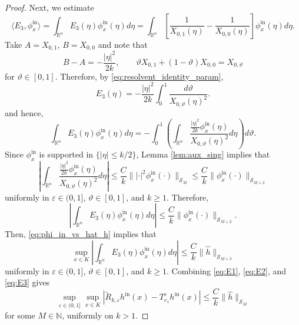 \documentclass[12pt,a4paper]{amsart}
\numberwithin{equation}{section}
\theoremstyle{plain}
\theoremstyle{definition}
\begin{document}
\begin{proof}
Next, we estimate 
\begin{equation*}
    \langle E_3, \phi_x^{\mathrm{in}} \rangle = \int_{\mathbb{R}^n}
    E_3(\eta) \phi_x^{\mathrm{in}}(\eta) d\eta 
    = 
    \int_{\mathbb{R}^n}
    \left[\frac{1}{X_{0,1}(\eta)} - \frac{1}{X_{0,0}(\eta)}\right]\phi_x^{\mathrm{in}}(\eta) d\eta.
\end{equation*}
Take $A = X_{0,1}$, $B = X_{0,0}$ and note that
\begin{equation*}
    B - A = -\frac{|\eta|^2}{2k},
    \qquad
    \vartheta X_{0,1} + (1-\vartheta) X_{0,0} = X_{0,\vartheta}
\end{equation*}
for $\vartheta\in[0,1]$. Therefore, by \eqref{eq:resolvent_identity_param},
\begin{equation*}
    E_3(\eta) = -\frac{|\eta|^2}{2k}
    \int_0^1 \frac{d\vartheta}{X_{0,\vartheta}(\eta)^2}.
\end{equation*}
and hence,
\begin{equation*}
    \int_{\mathbb{R}^n} E_3(\eta) \phi_x^{\mathrm{in}}(\eta) d\eta
    =
    -\int_0^1 \left( \int_{\mathbb{R}^n} \frac{\frac{|\eta|^2}{2k} \phi_x^{\mathrm{in}}(\eta)} {X_{0,\vartheta}(\eta)^2} d\eta
\right) d\vartheta.
\end{equation*}
Since $\phi_x^{\mathrm{in}}$ is supported in $\{|\eta| \leq k/2\}$, Lemma \ref{lem:aux_sing} implies that 
\begin{equation*}
    \left|\int_{\mathbb{R}^n} \frac{\frac{|\eta|^2}{2k} \phi_x^{\mathrm{in}}(\eta)}{X_{0,\vartheta}(\eta)^2} d\eta\right|
    \leq
    \frac{C}{k} \||\cdot|^2\phi_x^{\mathrm{in}}(\cdot)\|_{\mathscr{S}_M} 
    \leq
    \frac{C}{k} \|\phi_x^{\mathrm{in}}(\cdot)\|_{\mathscr{S}_{M+2}}
\end{equation*}
uniformly in $\varepsilon\in (0,1]$, $\vartheta\in [0,1]$, and $k\geq 1$. Therefore,
\begin{equation*}
    \left|\int_{\mathbb{R}^n} E_3(\eta) \phi_x^{\mathrm{in}}(\eta) d\eta\right| \leq \frac{C}{k} \|\phi_x^{\mathrm{in}}(\cdot)\|_{\mathscr{S}_{M+2}}.
\end{equation*}
Then, \eqref{eq:phi_in_vs_hat_h} implies that
\begin{equation}\label{eq:E3}
     \sup_{x \in K}\left|\int_{\mathbb{R}^n} E_3(\eta) \phi_x^{\mathrm{in}}(\eta) d\eta \right| \leq \frac{C}{k} \|\widehat h\|_{\mathscr{S}_{M+3}}
\end{equation}
uniformly in $\varepsilon\in (0,1]$, $\vartheta\in [0,1]$, and $k\geq 1$.
Combining \eqref{eq:E1}, \eqref{eq:E2}, and \eqref{eq:E3} gives
\begin{equation}\label{eq:final_eps}
    \sup_{\varepsilon\in(0,1]} \sup_{x\in K}
  \left|
    \widetilde{R}_{k,\varepsilon} h^{\mathrm{in}}(x)
    - T_{e_1}^\varepsilon h^{\mathrm{in}}(x)
  \right|
  \leq \frac{C}{k}\|\widehat h\|_{\mathscr{S}_{M}}
\end{equation}
for some $M\in \mathbb{N}$, uniformly on $k> 1$.


\end{proof}
\end{document}
